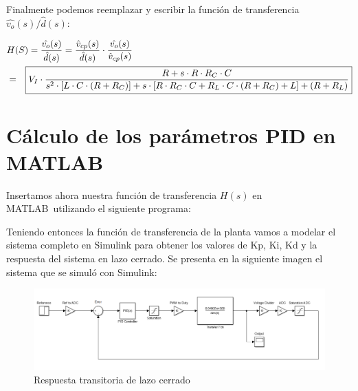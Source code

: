 \documentclass[12pt]{report}
\begin{document}
	Finalmente podemos reemplazar y escribir la función de transferencia $\hat{v_o}(s)/\hat{d}(s)$:
	
	\begin{equation}
	\begin{aligned}
	&H(S) = \dfrac{\hat{v_o}(s)}{\hat{d}(s)} = \dfrac{\hat{v}_{cp}(s)}{\hat{d}(s)} \cdot \dfrac{\hat{v_o}(s)}{\hat{v}_{cp}(s)} \\	
	&=\Aboxed{V_I \cdot \dfrac{R + s \cdot R \cdot R_C \cdot C}{s^2 \cdot [L \cdot C \cdot (R + R_C)] + s \cdot [R \cdot R_C \cdot C + R_L \cdot C \cdot (R + R_C) + L] + (R + R_L)}}
	\end{aligned}
	\end{equation}
	
\section{Cálculo de los parámetros PID en MATLAB\textregistered}


	Insertamos ahora nuestra función de transferencia $H(s)$ en MATLAB\textregistered \ utilizando el siguiente programa: 

	\begin{minipage}{\textwidth}
		
	\end{minipage}
	
	Teniendo entonces la función de transferencia de la planta vamos a modelar el sistema completo en Simulink para obtener los valores de Kp, Ki, Kd y la respuesta del sistema en lazo cerrado. Se presenta en la siguiente imagen el sistema que se simuló con Simulink:
	
	\begin{figure}[H]
		\centering
		\includegraphics[width=\textwidth,height=\textheight,keepaspectratio]{Simulink} 
		\caption{Respuesta transitoria de lazo cerrado}
	\end{figure}
	
\end{document}
